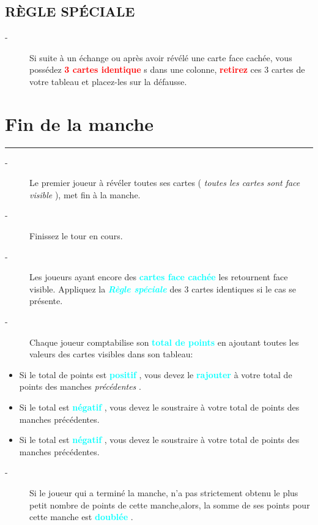 \documentclass{article}%
\begin{document}
%
\subsection{ RÈGLE SPÉCIALE
}%
\label{subsec:RGLESPCIALE}%
\begin{description}%
\item[{-} ]%
%
 Si suite à un échange ou après avoir révélé une carte face cachée, vous possédez %
\textcolor{red}{%
\textbf{3 cartes identique}%
}%
s dans une colonne, %
\textcolor{red}{%
\textbf{retirez}%
}%
\textit{ }%
 ces 3 cartes de votre tableau et placez{-}les sur la défausse.
%
\end{description}

%
\sectionfont{\color{cyan}}%
\subsectionfont{\color{cyan}}%
\subsubsectionfont{\color{cyan}}%
\section{ Fin de la manche
}%
\label{sec:Findelamanche}%
\textcolor{cyan}{\rule{18cm}{0.07cm}}\break%
\begin{description}%
\item[{-} ]%
%
Le premier joueur à révéler toutes ses cartes (%
\textit{toutes les cartes sont face visible}%
), met fin à la manche.
%
\item[{-} ]%
%
 Finissez le tour en cours.
%
\item[{-} ]%
%
 Les joueurs ayant encore des %
\textcolor{cyan}{%
\textbf{cartes face cachée}%
}%
\textit{ }%
 les retournent face visible. Appliquez la %
\textcolor{cyan}{\textbf{\textit{Règle spéciale}}}%
\textit{ }%
 des 3 cartes identiques si le cas se présente.
%
\item[{-} ]%
%
 Chaque joueur comptabilise son %
\textcolor{cyan}{%
\textbf{total de points}%
}%
\textit{ }%
 en ajoutant toutes les valeurs des cartes visibles dans son tableau:
%
\end{description}%
\begin{itemize}%
\item%
%
 Si le total de points est %
\textcolor{cyan}{%
\textbf{positif}%
}%
, vous devez le %
\textcolor{cyan}{%
\textbf{rajouter}%
}%
\textit{ }%
 à votre total de points des manches %
\textit{précédentes}%
.
%
\item%
%
 Si le total est %
\textcolor{cyan}{%
\textbf{négatif}%
}%
, vous devez le soustraire à votre total de points des manches précédentes.
%
\end{itemize}%
\begin{itemize}%
\item%
%
 Si le total est %
\textcolor{cyan}{%
\textbf{négatif}%
}%
, vous devez le soustraire à votre total de points des manches précédentes.
%
\end{itemize}%
\begin{description}%
\item[{-} ]%
%
Si le joueur qui a terminé la manche, n’a pas strictement obtenu le plus petit nombre de points de cette manche,alors, la somme de ses points pour cette manche est %
\textcolor{cyan}{%
\textbf{doublée}%
}%
.
%
\end{description}
\end{document}
